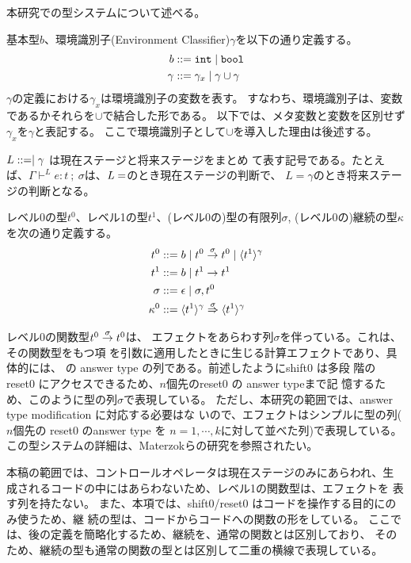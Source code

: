 本研究での型システムについて述べる。

基本型$b$、環境識別子(Environment Classifier)$\gamma$を以下の通り定義する。
\begin{align*}
  b & ::= \mbox{\texttt{int}} \mid \mbox{\texttt{bool}} \\
  \gamma & ::= \gamma_x \mid \gamma \cup \gamma 
\end{align*}
$\gamma$の定義における$\gamma_x$は環境識別子の変数を表す。
すなわち、環境識別子は、変数であるかそれらを$\cup$で結合した形である。
以下では、メタ変数と変数を区別せず$\gamma_x$を$\gamma$と表記する。
ここで環境識別子として$\cup$を導入した理由は後述する。

$L ::= \empty \mid \gamma$ は現在ステージと将来ステージをまとめ
て表す記号である。たとえば、$\Gamma \vdash^L
e:t~;~\sigma$は、$L=\empty$のとき現在ステージの判断で、
$L=\gamma$のとき将来ステージの判断となる。

レベル0の型$t^0$、レベル1の型$t^1$、(レベル0の)型の有限列$\sigma$,
(レベル0の)継続の型$\kappa$を次の通り定義する。
\begin{align*}
  t^0 & ::= b \mid {t^0} \stackrel{\sigma}{\rightarrow} {t^0} \mid \langle{t^1}\rangle^{\gamma} \\
  t^1 & ::= b \mid t^1 \to t^1 \\
  \sigma & ::= \epsilon \mid \sigma,t^0 \\
  \kappa^0 & ::= {\langle{t^1}\rangle^{\gamma}} \stackrel{\sigma}{\Rightarrow} {\langle{t^1}\rangle^{\gamma}}
\end{align*}

レベル0の関数型${t^0} \stackrel{\sigma}{\rightarrow} {t^0}$は、
エフェクトをあらわす列$\sigma$を伴っている。これは、その関数型をもつ項
を引数に適用したときに生じる計算エフェクトであり、具体的には、
\Shiftz の answer type の列である。前述したようにshift0 は多段
階の reset0 にアクセスできるため、$n$個先のreset0 の answer typeまで記
憶するため、このように型の列$\sigma$で表現している。
ただし、本研究の範囲では、answer type modification に対応する必要はな
いので、エフェクトはシンプルに型の列($n$個先の reset0 のanswer type を
$n=1,\cdots,k$に対して並べた列)で表現している。
この型システムの詳細は、Materzokら\cite{Materzok2011}の研究を参照されたい。

本稿の範囲では、コントロールオペレータは現在ステージのみにあらわれ、生
成されるコードの中にはあらわないため、レベル1の関数型は、エフェクトを
表す列を持たない。
また、本項では、shift0/reset0 はコードを操作する目的にのみ使うため、継
続の型は、コードからコードへの関数の形をしている。
ここでは、後の定義を簡略化するため、継続を、通常の関数とは区別しており、
そのため、継続の型も通常の関数の型とは区別して二重の横線で表現している。

